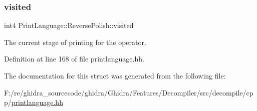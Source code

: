 \subsubsection{\texorpdfstring{visited}{visited}}
{\footnotesize\ttfamily int4 Print\+Language\+::\+Reverse\+Polish\+::visited}



The current stage of printing for the operator. 



Definition at line 168 of file printlanguage.\+hh.



The documentation for this struct was generated from the following file\+:\begin{DoxyCompactItemize}
\item 
F\+:/re/ghidra\+\_\+sourcecode/ghidra/\+Ghidra/\+Features/\+Decompiler/src/decompile/cpp/\mbox{\hyperlink{printlanguage_8hh}{printlanguage.\+hh}}\end{DoxyCompactItemize}
